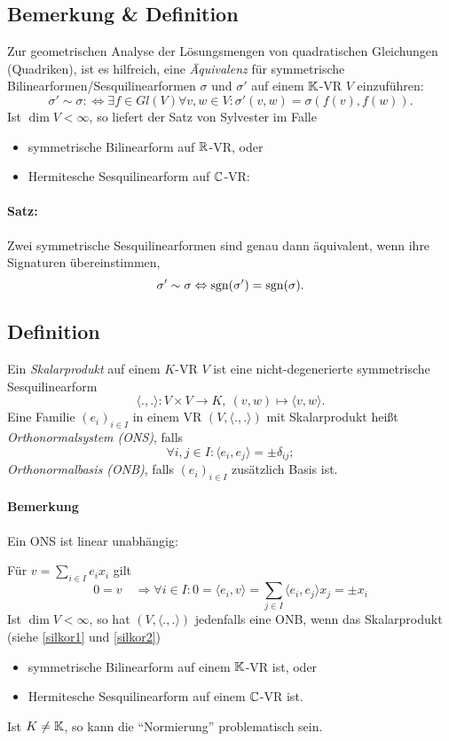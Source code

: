 \subsection{Bemerkung \& Definition}
	Zur geometrischen Analyse der Lösungsmengen von quadratischen Gleichungen (Quadriken), ist es hilfreich, eine \emph{Äquivalenz} für symmetrische Bilinearformen/Sesquilinearformen $ \sigma $ und $ \sigma' $ auf einem $ \mathbb{K} $-VR $ V $ einzuführen:
		\[ \sigma' \sim \sigma :\Leftrightarrow \exists f\in Gl(V)\forall v,w\in V: \sigma'(v,w) = \sigma(f(v),f(w)). \]
	Ist $ \dim V <\infty $, so liefert der Satz von Sylvester im Falle
		\begin{itemize}
			\item symmetrische Bilinearform auf $ \mathbb{R} $-VR, oder
			\item Hermitesche Sesquilinearform auf $ \mathbb{C} $-VR:
		\end{itemize}
\paragraph{Satz:}
	Zwei symmetrische Sesquilinearformen sind genau dann äquivalent, wenn ihre Signaturen übereinstimmen,
		\[ \sigma' \sim \sigma \Leftrightarrow  \operatorname{sgn}(\sigma') = \operatorname{sgn}(\sigma). \]
		
\subsection{Definition}
	Ein \emph{Skalarprodukt} auf einem $ K $-VR $ V $ ist eine nicht-degenerierte symmetrische Sesquilinearform
		\[ \langle.,.\rangle:V\times V \to K,\ (v,w)\mapsto \langle v,w\rangle. \]
	Eine Familie $ (e_i)_{i\in I} $ in einem VR $ (V,\langle.,.\rangle) $ mit Skalarprodukt heißt \emph{Orthonormalsystem (ONS)}, falls
		\[ \forall i,j\in I: \langle e_i,e_j\rangle = \pm \delta_{ij}; \]
	\emph{Orthonormalbasis (ONB)}, falls $ (e_i)_{i\in I} $ zusätzlich Basis ist.
\paragraph{Bemerkung}
	Ein ONS ist linear unabhängig:

	Für $ v=\sum_{i\in I}e_ix_i $ gilt
		\[ 0 = v \quad\Rightarrow \forall i\in I: 0 = \langle e_i,v\rangle = \sum_{j\in I}\langle e_i,e_j\rangle x_j = \pm x_i \]
	Ist $ \dim V < \infty $, so hat $ (V,\langle.,.\rangle) $ jedenfalls eine ONB, wenn das Skalarprodukt (siehe \ref{silkor1} und \ref{silkor2})
		\begin{itemize}
			\item symmetrische Bilinearform auf einem $ \mathbb{K} $-VR ist, oder
			\item Hermitesche Sesquilinearform auf einem $ \mathbb{C} $-VR ist.
		\end{itemize}
	Ist $ K\neq \mathbb{K} $, so kann die "`Normierung"' problematisch sein.
